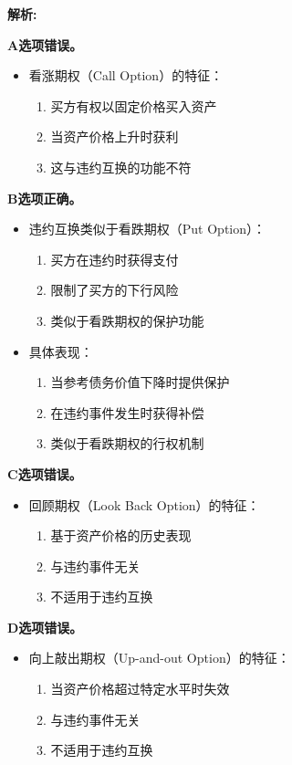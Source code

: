 \documentclass{article}
\newenvironment{explanation}
{\textbf{解析:}\par}
{\par}
\begin{document}
\begin{explanation}
    \textbf{A选项错误。}
    \begin{itemize}
        \item 看涨期权（Call Option）的特征：
        \begin{enumerate}
            \item 买方有权以固定价格买入资产
            \item 当资产价格上升时获利
            \item 这与违约互换的功能不符
        \end{enumerate}
    \end{itemize}
    
    \textbf{B选项正确。}
    \begin{itemize}
        \item 违约互换类似于看跌期权（Put Option）：
        \begin{enumerate}
            \item 买方在违约时获得支付
            \item 限制了买方的下行风险
            \item 类似于看跌期权的保护功能
        \end{enumerate}
        \item 具体表现：
        \begin{enumerate}
            \item 当参考债务价值下降时提供保护
            \item 在违约事件发生时获得补偿
            \item 类似于看跌期权的行权机制
        \end{enumerate}
    \end{itemize}
    
    \textbf{C选项错误。}
    \begin{itemize}
        \item 回顾期权（Look Back Option）的特征：
        \begin{enumerate}
            \item 基于资产价格的历史表现
            \item 与违约事件无关
            \item 不适用于违约互换
        \end{enumerate}
    \end{itemize}
    
    \textbf{D选项错误。}
    \begin{itemize}
        \item 向上敲出期权（Up-and-out Option）的特征：
        \begin{enumerate}
            \item 当资产价格超过特定水平时失效
            \item 与违约事件无关
            \item 不适用于违约互换
        \end{enumerate}
    \end{itemize}
\end{explanation}
\end{document}
